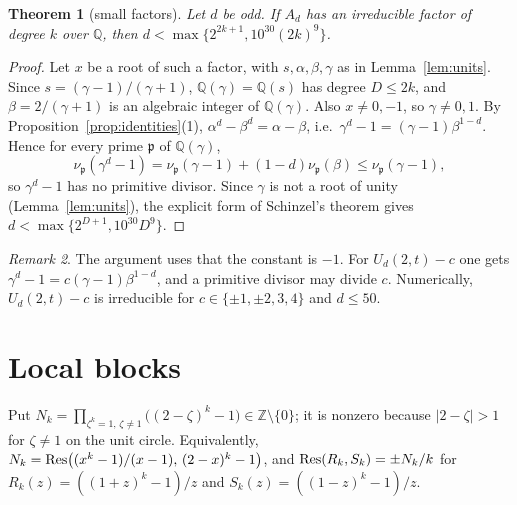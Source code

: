 \documentclass[11pt]{amsart}
\newtheorem{theorem}{Theorem}[section]\newtheorem{proposition}[theorem]{Proposition}\newtheorem{lemma}[theorem]{Lemma}
\theoremstyle{definition}\newtheorem{definition}[theorem]{Definition}\newtheorem{example}[theorem]{Example}
\theoremstyle{remark}\newtheorem{remark}[theorem]{Remark}
\newcommand{\Q}{\mathbb Q}\newcommand{\Z}{\mathbb Z}\newcommand{\F}{\mathbb F}
\begin{document}
\begin{theorem}[small factors]\label{thm:small}
Let $d$ be odd. If $A_d$ has an irreducible factor of degree $k$ over $\Q$, then $d<\max\{2^{2k+1},10^{30}(2k)^9\}$.
\end{theorem}
\begin{proof}
Let $x$ be a root of such a factor, with $s,\alpha,\beta,\gamma$ as in Lemma~\ref{lem:units}. Since $s=(\gamma-1)/(\gamma+1)$, $\Q(\gamma)=\Q(s)$
has degree $D\le2k$, and $\beta=2/(\gamma+1)$ is an algebraic integer of $\Q(\gamma)$. Also $x\ne0,-1$, so $\gamma\ne0,1$. By
Proposition~\ref{prop:identities}(1), $\alpha^d-\beta^d=\alpha-\beta$, i.e.\ $\gamma^d-1=(\gamma-1)\beta^{1-d}$. Hence for every prime
$\mathfrak p$ of $\Q(\gamma)$,
\[\nu_{\mathfrak p}(\gamma^d-1)=\nu_{\mathfrak p}(\gamma-1)+(1-d)\nu_{\mathfrak p}(\beta)\le\nu_{\mathfrak p}(\gamma-1),\]
so $\gamma^d-1$ has no primitive divisor. Since $\gamma$ is not a root of unity (Lemma~\ref{lem:units}), the explicit form \cite[Thm~4.2]{BL} of Schinzel's
theorem \cite{Schinzel} gives $d<\max\{2^{D+1},10^{30}D^9\}$.
\end{proof}
\begin{remark}
The argument uses that the constant is $-1$. For $U_d(2,t)-c$ one gets $\gamma^d-1=c(\gamma-1)\beta^{1-d}$, and a primitive divisor may divide
$c$. Numerically, $U_d(2,t)-c$ is irreducible for $c\in\{\pm1,\pm2,3,4\}$ and $d\le50$.
\end{remark}

\section{Local blocks}\label{sec:blocks}
Put $N_k=\prod_{\zeta^k=1,\,\zeta\ne1}\bigl((2-\zeta)^k-1\bigr)\in\Z\setminus\{0\}$; it is nonzero because $|2-\zeta|>1$ for $\zeta\ne1$ on the
unit circle. Equivalently, $N_k=\operatorname{Res}\bigl((x^k-1)/(x-1),\,(2-x)^k-1\bigr)$, and $\operatorname{Res}(R_k,S_k)=\pm N_k/k$ for $R_k(z)=((1+z)^k-1)/z$ and
$S_k(z)=((1-z)^k-1)/z$.
\end{document}
